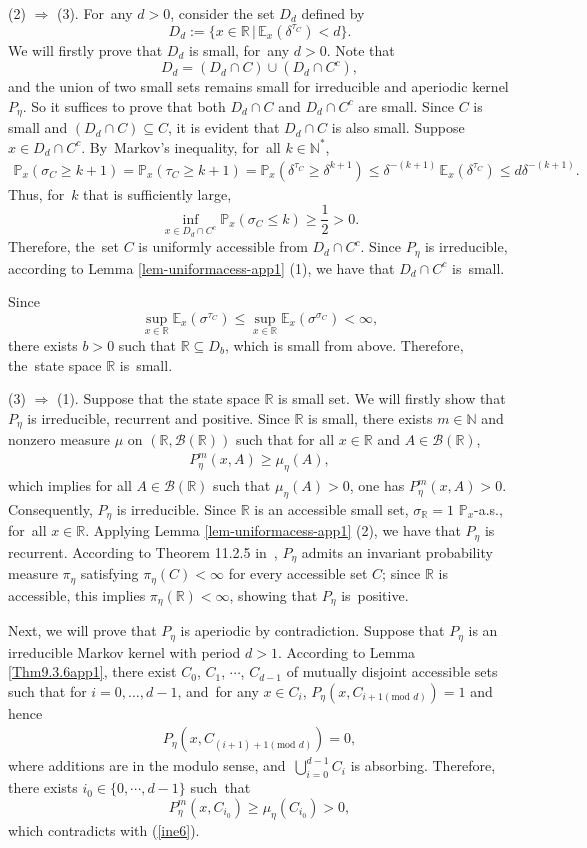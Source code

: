 \documentclass[11pt]{elsarticle}
\def\geq{\geqslant}
\def\leq{\leqslant}
\def\P{\mathbb{P}}
\def\E{\mathbb{E}}
\def\N{\mathbb{N}}
\def\R{\mathbb{R}}
\begin{document}
\begin{pf}
	(2) $\Longrightarrow$ (3). For~any $d>0$, consider the set $D_d$ defined by
	$$D_d:=\{x\in \R\,|\,\E_x\left(\delta^{\tau_C}\right)<d\}.$$
	We will firstly prove that $D_d$ is small, for~any $d>0$. Note that 
	$$D_d=(D_d\cap C)\cup\left(D_d\cap C^c\right),$$ 
	and the union of two small sets remains small for irreducible and aperiodic kernel $P_\eta$. So it suffices to prove that both $D_d\cap C$ and $D_d\cap C^c$ are small. Since $C$ is small and $(D_d\cap C)\subseteq C$, it is evident that $D_d\cap C$ is also small. Suppose $x\in D_d\cap C^c$. By~Markov's inequality, for~all $k\in\N^*$,
	\begin{align*}
		\P_x(\sigma_C\geq k+1)=\P_x(\tau_C\geq k+1)=\P_x(\delta^{\tau_C}\geq\delta^{k+1})\leq\delta^{-(k+1)}\,\E_x\left(\delta^{\tau_C}\right)\leq d\delta^{-(k+1)}.
	\end{align*}
	Thus, for~$k$ that is sufficiently large,
	$$\inf_{x\in D_d\cap C^c }\P_x(\sigma_C\leq k)\geq\frac{1}{2}>0.$$
	Therefore, the~set $C$ is uniformly accessible from $D_d\cap C^c$. Since $P_\eta$ is irreducible, according to Lemma \ref{lem-uniformacess-app1} (1), we have that $D_d\cap C^c$ is~small. 
	
	Since
	$$\sup_{x\in\R}\E_x\left(\sigma^{\tau_C}\right)\leq\sup_{x\in\R}\E_x\left(\sigma^{\sigma_C}\right)<\infty,$$
	there exists $b>0$ such that $\R\subseteq D_b$, which is small from above. Therefore, the~state space $\R$ is~small.
	
	(3) $\Longrightarrow$ (1). Suppose that the state space $\R$ is small set. We will firstly show that $P_\eta$ is irreducible, recurrent and positive. Since $\R$ is small, there exists $m\in\N$ and nonzero measure $\mu$ on $(\R,\mathcal{B}(\R))$ such that for all $x\in\R$ and $A\in\mathcal{B}(\R)$,
	\begin{align*}
		P_\eta^m(x,A)\geq\mu_\eta(A),
	\end{align*}
	which implies for all $A\in\mathcal{B}(\R)$ such that $\mu_\eta(A)>0$, one has $P_\eta^m(x,A)>0$. Consequently, $P_\eta$ is irreducible. Since $\R$ is an accessible small set, $\sigma_\R=1$ $\P_x$-a.s., for~all $x\in\R$. Applying Lemma \ref{lem-uniformacess-app1} (2), we have that $P_\eta$ is recurrent. According to {Theorem 11.2.5} in~\cite{DMPS18}, $P_\eta$ admits an invariant probability measure $\pi_\eta$ satisfying $\pi_\eta(C)<\infty$ for every accessible set $C$; since $\R$ is accessible, this implies $\pi_\eta(\R)<\infty$, showing that $P_\eta$ is~positive.
	
	Next, we will prove that $P_\eta$ is aperiodic by contradiction. Suppose that $P_\eta$ is an irreducible Markov kernel with period $d>1$. According to Lemma \ref{Thm9.3.6app1}, there exist $C_0$, $C_1$, $\cdots$, $C_{d-1}$ of mutually disjoint accessible sets such that  for $i=0,\ldots,d-1$, and~for any $x\in C_i$, $P_\eta\left(x,C_{i+1(\text{mod }d)}\right)=1$ and hence
	\begin{align}\label{ine6}
		P_\eta(x,C_{(i+1)+1(\text{mod }d)})=0,
	\end{align}
	where additions are in the modulo sense, and~$\bigcup_{i=0}^{d-1}C_i$ is absorbing. Therefore, there exists $i_0\in\{0,\cdots,d-1\}$ such~that
	$$P_\eta^m(x,C_{i_0})\geq\mu_\eta(C_{i_0})>0,$$
	which contradicts with (\ref{ine6}).
	

\end{pf}
\end{document}

